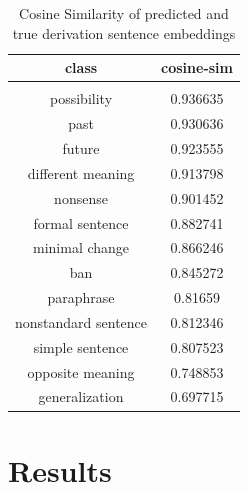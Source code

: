\documentclass[11pt]{article}
\begin{document}
\begin{table}[!htp]
\centering
\begin{tabular}{ c c }
\toprule
\vspace{0.1cm}
\textbf{class}&\textbf{cosine-sim} \vspace{0.15cm}\\ 
 \hline \\[-1.2ex]
\vspace{0.1cm} possibility &    0.936635 \\
\vspace{0.1cm} past & 0.930636 \\
\vspace{0.1cm} future &     0.923555 \\
\vspace{0.1cm} different meaning &    0.913798 \\
\vspace{0.1cm} nonsense &   0.901452 \\
\vspace{0.1cm} formal sentence &0.882741 \\
\vspace{0.1cm} minimal change & 0.866246 \\
\vspace{0.1cm} ban &  0.845272 \\
\vspace{0.1cm} paraphrase & 0.81659  \\
\vspace{0.1cm} nonstandard sentence & 0.812346 \\
\vspace{0.1cm} simple sentence &0.807523 \\
\vspace{0.1cm} opposite meaning &     0.748853 \\
\vspace{0.1cm} generalization & 0.697715 \\
\toprule
\end{tabular}
\caption{Cosine Similarity of predicted and true derivation sentence embeddings}
\label{cosine}
\end{table}
\section{Results}

\end{document}
